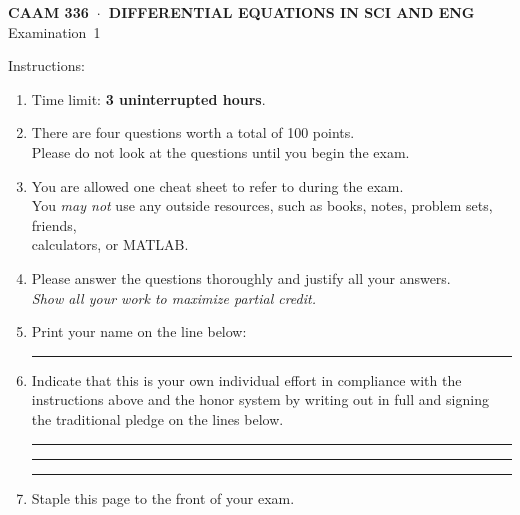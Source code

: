 \documentclass[11pt]{article}
\begin{document}
\thispagestyle{empty}
\vspace*{0em}
   \begin{center}
      \textsf{\textbf{CAAM 336\ $\cdot$\ DIFFERENTIAL EQUATIONS IN SCI AND ENG}}\\[0.5em]
       \textsf{Examination~1}
   \end{center}
   
\vspace*{3em}
Instructions:
\begin{enumerate}
\item Time limit: \textbf{3 uninterrupted hours}.
\item There are four questions worth a total of 100 points.\\
      Please do not look at the questions until you begin the exam.
\item You are allowed one cheat sheet to refer to during the exam. \\
You \emph{may not} use any outside resources, such as books, notes, problem sets, friends,\\
      calculators, or MATLAB. 
\item Please answer the questions thoroughly and justify all your answers.\\
      \emph{Show all your work to maximize partial credit.}

\item Print your name on the line below:

\vspace*{1em}\rule{6in}{0.5pt}

\item Indicate that this is your own individual effort in compliance with 
      the instructions above and the honor system by writing out in full 
      and signing the traditional pledge on the lines below.

\vspace*{1em}\rule{6in}{0.5pt}

\vspace*{1em}\rule{6in}{0.5pt}

\vspace*{1em}\rule{6in}{0.5pt}

\item Staple this page to the front of your exam.

\end{enumerate}
\end{document}
